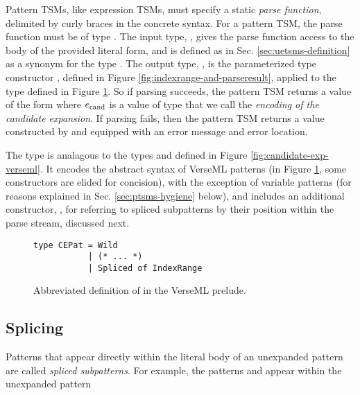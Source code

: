 {Pattern TSMs, like expression TSMs, must specify a static \emph{parse function}, delimited by curly braces in the concrete syntax. For a pattern TSM, the parse function must be of type . The input type, , gives the parse function access to the body of the provided literal form, and is defined as in Sec. \ref{sec:uetsms-definition} as a synonym for the type . The output type, , is the parameterized type constructor , defined in Figure \ref{fig:indexrange-and-parseresult}, applied to the type  defined in Figure \ref{fig:CEPat}.  So if parsing succeeds, the pattern TSM returns a value of the form  where $e_\text{cand}$ is a value of type  that we call the \emph{encoding of the candidate expansion}. If parsing fails, then the pattern TSM returns a value constructed by  and equipped with an error message and error location. 

The type  is analagous to the types  and  defined in Figure \ref{fig:candidate-exp-verseml}. It encodes the abstract syntax of VerseML patterns (in Figure \ref{fig:CEPat}, some constructors are elided for concision), with the exception of variable patterns (for reasons explained in Sec. \ref{sec:ptsms-hygiene} below), and includes an additional constructor, , for referring to spliced subpatterns by their position within the parse stream, discussed next.

\begin{figure}
\begin{lstlisting}[numbers=none]
type CEPat = Wild
           | (* ... *)
           | Spliced of IndexRange
\end{lstlisting}
\caption[Abbreviated definition of  in VerseML]{Abbreviated definition of  in the VerseML prelude.}
\label{fig:CEPat}
\end{figure}

\subsection{Splicing}\label{sec:ptsms-splicing}
Patterns that appear directly within the literal body of an unexpanded pattern are called \emph{spliced subpatterns}. For example, the patterns  and  appear within the unexpanded pattern \li{#\dolla#rx /SURL@EURLnameSURL: %
When the parse function determines that a subsequence of the literal body should be treated as a spliced subpatern (here, by recognizing the characters \li{@} or \li{%
it can refer to it within the candidate expansion that it construct a reference to it for use within the candidate expansion it generates using the \li{Spliced} constructor of the \li{CEPat} type shown in Figure \ref{fig:CEPat}. The \li{Spliced} constructor requires a value of type \li{IndexRange} because spliced subpatterns are referred to indirectly by their position within the literal body. This prevents pattern TSMs from ``forging'' a spliced subpattern (i.e. claiming that some pattern is a spliced subpattern, even though it does not appear in the literal body).

}}}
